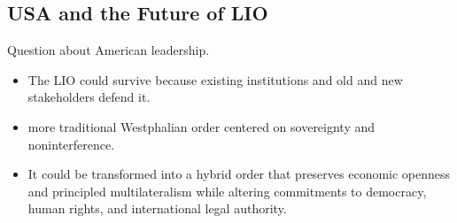 \subsection{USA and the Future of LIO}
Question about American leadership.

\begin{itemize}
    \item The LIO could survive because existing institutions and old and new stakeholders defend it.
    \item more traditional Westphalian order centered on sovereignty and noninterference.
    \item It could be transformed into a hybrid order that preserves economic openness and principled multilateralism while altering commitments to democracy, human rights, and international legal authority.
\end{itemize}